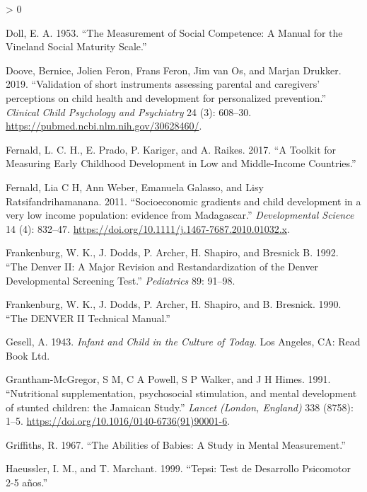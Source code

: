 \documentclass[
]{book}
\newlength{\cslhangindent}
\newenvironment{CSLReferences}[2] %
 {%
  \setlength{\parindent}{0pt}
  \ifodd #1 \everypar{\setlength{\hangindent}{\cslhangindent}}\ignorespaces\fi
  \ifnum #2 > 0
  \setlength{\parskip}{#2\baselineskip}
  \fi
 }%
 {}
\begin{document}
\begin{CSLReferences}{1}{0}
\leavevmode\hypertarget{ref-doll1953}{}%
Doll, E. A. 1953. {``The Measurement of Social Competence: A Manual for the Vineland Social Maturity Scale.''}

\leavevmode\hypertarget{ref-doove2019}{}%
Doove, Bernice, Jolien Feron, Frans Feron, Jim van Os, and Marjan Drukker. 2019. {``{Validation of short instruments assessing parental and caregivers' perceptions on child health and development for personalized prevention}.''} \emph{Clinical Child Psychology and Psychiatry} 24 (3): 608--30. \url{https://pubmed.ncbi.nlm.nih.gov/30628460/}.

\leavevmode\hypertarget{ref-fernald2017toolkit}{}%
Fernald, L. C. H., E. Prado, P. Kariger, and A. Raikes. 2017. {``A Toolkit for Measuring Early Childhood Development in Low and Middle-Income Countries.''}

\leavevmode\hypertarget{ref-Fernald2011}{}%
Fernald, Lia C H, Ann Weber, Emanuela Galasso, and Lisy Ratsifandrihamanana. 2011. {``{Socioeconomic gradients and child development in a very low income population: evidence from Madagascar.}''} \emph{Developmental Science} 14 (4): 832--47. \url{https://doi.org/10.1111/j.1467-7687.2010.01032.x}.

\leavevmode\hypertarget{ref-frankenburg1992}{}%
Frankenburg, W. K., J. Dodds, P. Archer, H. Shapiro, and Bresnick B. 1992. {``The Denver II: A Major Revision and Restandardization of the Denver Developmental Screening Test.''} \emph{Pediatrics} 89: 91--98.

\leavevmode\hypertarget{ref-frankenburg1990}{}%
Frankenburg, W. K., J. Dodds, P. Archer, H. Shapiro, and B. Bresnick. 1990. {``The DENVER II Technical Manual.''}

\leavevmode\hypertarget{ref-gesell1943}{}%
Gesell, A. 1943. \emph{Infant and Child in the Culture of Today}. Los Angeles, CA: Read Book Ltd.

\leavevmode\hypertarget{ref-Grantham-McGregor1991}{}%
Grantham-McGregor, S M, C A Powell, S P Walker, and J H Himes. 1991. {``{Nutritional supplementation, psychosocial stimulation, and mental development of stunted children: the Jamaican Study.}''} \emph{Lancet (London, England)} 338 (8758): 1--5. \url{https://doi.org/10.1016/0140-6736(91)90001-6}.

\leavevmode\hypertarget{ref-griffiths1967}{}%
Griffiths, R. 1967. {``The Abilities of Babies: A Study in Mental Measurement.''}

\leavevmode\hypertarget{ref-haeussler1999}{}%
Haeussler, I. M., and T. Marchant. 1999. {``Tepsi: Test de Desarrollo Psicomotor 2-5 años.''}


\end{CSLReferences}
\end{document}
